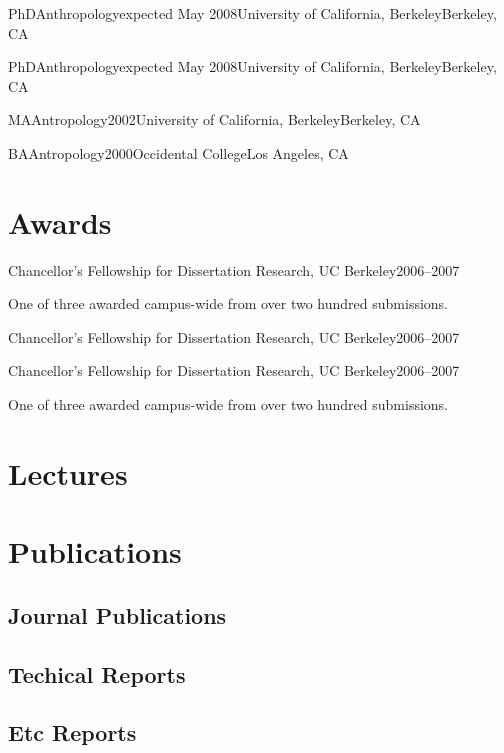 \documentclass[10pt,letterpaper,lmodern]{mtvita}
\begin{document}
\begin{degree}{PhD}{Anthropology}{expected May 2008}{University of California, Berkeley}{Berkeley, CA}
\degreeindent
\degreeindent\lipsum[1]
\end{degree}

\begin{degree}{PhD}{Anthropology}{expected May 2008}{University of California, Berkeley}{Berkeley, CA}
\end{degree}

\begin{degree}{MA}{Antropology}{2002}{University of California, Berkeley}{Berkeley, CA}\end{degree}

\begin{degree*}{BA}{Antropology}{2000}{Occidental College}{Los Angeles, CA}\end{degree*}

\section{Awards}
\begin{award}{Chancellor's Fellowship for Dissertation Research, UC Berkeley}{2006--2007}%
\par\noindent One of three awarded campus-wide from over two hundred submissions.
\end{award}

\begin{award}{Chancellor's Fellowship for Dissertation Research, UC Berkeley}{2006--2007}%
\end{award}

\begin{award}{Chancellor's Fellowship for Dissertation Research, UC Berkeley}{2006--2007}%
\par\noindent One of three awarded campus-wide from over two hundred submissions.
\end{award}

\section{Lectures}

\section{Publications}
\subsection*{Journal Publications}
\subsection*{Techical Reports}
\subsection*{Etc Reports}
\end{document}
